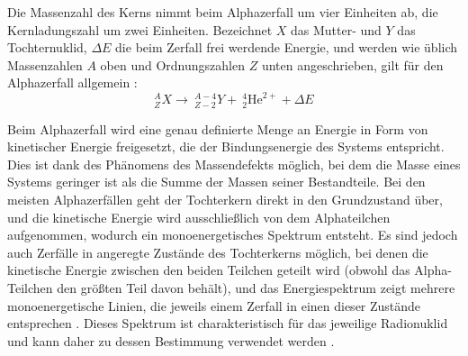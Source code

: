 Die Massenzahl des Kerns nimmt beim Alphazerfall um vier Einheiten ab, die Kernladungszahl um zwei Einheiten. Bezeichnet $X$ das Mutter- und $Y$ das Tochternuklid, $\Delta E$  die beim Zerfall frei werdende Energie, und werden wie üblich Massenzahlen $A$ oben und Ordnungszahlen $Z$ unten angeschrieben, gilt für den Alphazerfall allgemein \cite{dewiki:240085809}: 
\begin{equation*}
	^{A}_{Z}X \longrightarrow \ ^{A-4}_{Z-2}Y + \ ^4_2\text{He}^{2+} + \Delta E
\end{equation*}

Beim Alphazerfall wird eine genau definierte Menge an Energie in Form von kinetischer Energie freigesetzt, die der Bindungsenergie des Systems entspricht. Dies ist dank des Phänomens des Massendefekts möglich, bei dem die Masse eines Systems geringer ist als die Summe der Massen seiner Bestandteile. Bei den meisten Alphazerfällen geht der Tochterkern direkt in den Grundzustand über, und die kinetische Energie wird ausschließlich von dem Alphateilchen aufgenommen, wodurch ein monoenergetisches Spektrum entsteht. Es sind jedoch auch Zerfälle in angeregte Zustände des Tochterkerns möglich, bei denen die kinetische Energie zwischen den beiden Teilchen geteilt wird (obwohl das Alpha-Teilchen den größten Teil davon behält), und das Energiespektrum zeigt mehrere monoenergetische Linien, die jeweils einem Zerfall in einen dieser Zustände entsprechen \cite{leo}. Dieses Spektrum ist charakteristisch für das jeweilige Radionuklid und kann daher zu dessen Bestimmung verwendet werden \cite{dewiki:240085809}.


